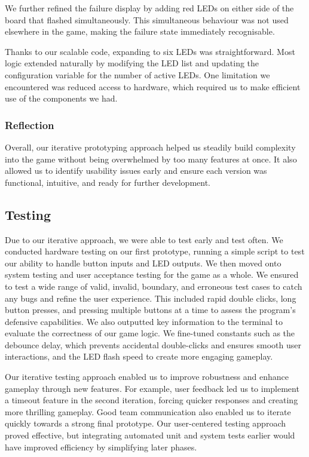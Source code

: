 \documentclass[11pt]{article}
\begin{document}
We further refined the failure display by adding red LEDs on either side of the board that flashed simultaneously. This simultaneous behaviour was not used elsewhere in the game, making the failure state immediately recognisable.

Thanks to our scalable code, expanding to six LEDs was straightforward. Most logic extended naturally by modifying the LED list and updating the configuration variable for the number of active LEDs. One limitation we encountered was reduced access to hardware, which required us to make efficient use of the components we had.

\subsubsection{Reflection}

Overall, our iterative prototyping approach helped us steadily build complexity into the game without being overwhelmed by too many features at once. It also allowed us to identify usability issues early and ensure each version was functional, intuitive, and ready for further development.

\subsection{Testing}
Due to our iterative approach, we were able to test early and test often. We conducted hardware testing on our first prototype, running a simple script to test our ability to handle button inputs and LED outputs. We then moved onto system testing and user acceptance testing for the game as a whole. We ensured to test a wide range of valid, invalid, boundary, and erroneous test cases to catch any bugs and refine the user experience. This included rapid double clicks, long button presses, and pressing multiple buttons at a time to assess the program's defensive capabilities. We also outputted key information to the terminal to evaluate the correctness of our game logic. We fine-tuned constants such as the debounce delay, which prevents accidental double-clicks and ensures smooth user interactions, and the LED flash speed to create more engaging gameplay.

Our iterative testing approach enabled us to improve robustness and enhance gameplay through new features. For example, user feedback led us to implement a timeout feature in the second iteration, forcing quicker responses and creating more thrilling gameplay. Good team communication also enabled us to iterate quickly towards a strong final prototype. Our user-centered testing approach proved effective, but integrating automated unit and system tests earlier would have improved efficiency by simplifying later phases.
\end{document}
